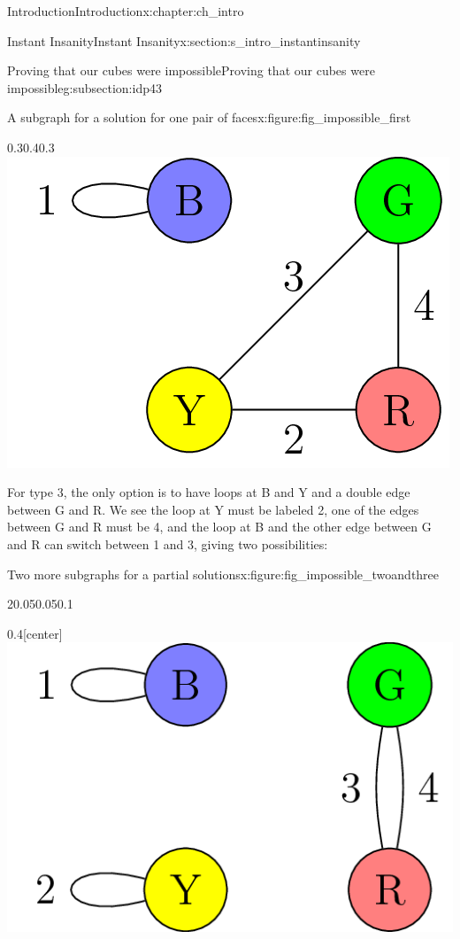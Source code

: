 \documentclass[oneside,10pt,]{book}
\numberwithin{equation}{section}
\begin{document}
\begin{chapterptx}{Introduction}{}{Introduction}{}{}{x:chapter:ch_intro}
\begin{sectionptx}{Instant Insanity}{}{Instant Insanity}{}{}{x:section:s_intro_instantinsanity}
\begin{subsectionptx}{Proving that our cubes were impossible}{}{Proving that our cubes were impossible}{}{}{g:subsection:idp43}
\begin{figureptx}{A subgraph for a solution for one pair of faces}{x:figure:fig_impossible_first}{}
\begin{image}{0.3}{0.4}{0.3}
\includegraphics[width=\linewidth]{images/InstantInsanityImpossibleFirst.png}
\end{image}%
\tcblower
\end{figureptx}%
For type 3, the only option is to have loops at B and Y and a double edge between G and R. We see the loop at Y must be labeled 2, one of the edges between G and R must be 4, and the loop at B and the other edge between G and R can switch between 1 and 3, giving two possibilities:%
\begin{figureptx}{Two more subgraphs for a partial solutions}{x:figure:fig_impossible_twoandthree}{}%
\begin{sidebyside}{2}{0.05}{0.05}{0.1}%
\begin{sbspanel}{0.4}[center]%
\includegraphics[width=\linewidth]{images/InstantInsanityImpossibleSecond.png}
\end{sbspanel}%

\end{sidebyside}
\end{figureptx}
\end{subsectionptx}
\end{sectionptx}
\end{chapterptx}
\end{document}
